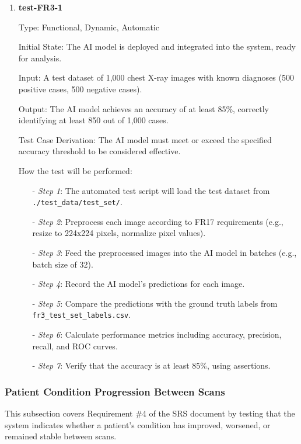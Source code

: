 \documentclass[12pt, titlepage]{article}
\begin{document}
\begin{enumerate}

\item \textbf{test-FR3-1} \label{test-FR3-1}

Type: Functional, Dynamic, Automatic

Initial State: The AI model is deployed and integrated into the system, ready for analysis.

Input: A test dataset of 1,000 chest X-ray images with known diagnoses (500 positive cases, 500 negative cases).

Output: The AI model achieves an accuracy of at least 85\%, correctly identifying at least 850 out of 1,000 cases.

Test Case Derivation: The AI model must meet or exceed the specified accuracy threshold to be considered effective.

How the test will be performed:
\begin{itemize}
  \item[-] \textit{Step 1}: The automated test script will load the test dataset from \texttt{./test\_data/test\_set/}.
  \item[-] \textit{Step 2}: Preprocess each image according to FR17 requirements (e.g., resize to 224x224 pixels, normalize pixel values).
  \item[-] \textit{Step 3}: Feed the preprocessed images into the AI model in batches (e.g., batch size of 32).
  \item[-] \textit{Step 4}: Record the AI model's predictions for each image.
  \item[-] \textit{Step 5}: Compare the predictions with the ground truth labels from \texttt{fr3\_test\_set\_labels.csv}.
  \item[-] \textit{Step 6}: Calculate performance metrics including accuracy, precision, recall, and ROC curves.
  \item[-] \textit{Step 7}: Verify that the accuracy is at least 85\%, using assertions.
\end{itemize}

\end{enumerate}

\subsubsection{Patient Condition Progression Between Scans}

This subsection covers Requirement \#4 of the SRS document by testing that the system indicates whether a patient's condition has improved, worsened, or remained stable between scans.
\end{document}
